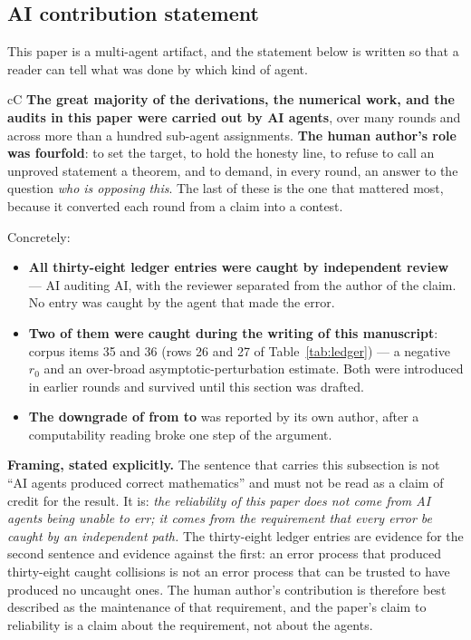 \subsection{AI contribution statement}
\label{sec:verdict-ai}

This paper is a multi-agent artifact, and the statement below is written so that a reader can tell
what was done by which kind of agent.

\begin{claimbox}{cC}
\textbf{The great majority of the derivations, the numerical work, and the audits in this paper were
carried out by AI agents}, over many rounds and across more than a hundred sub-agent assignments.
\textbf{The human author's role was fourfold}: to set the target, to hold the honesty line, to
refuse to call an unproved statement a theorem, and to demand, in every round, an answer to the
question \emph{who is opposing this}. The last of these is the one that mattered most, because it
converted each round from a claim into a contest.
\end{claimbox}

Concretely:

\begin{itemize}
\item \textbf{All thirty-eight ledger entries were caught by independent review} --- AI auditing
AI, with the reviewer separated from the author of the claim. No entry was caught by the agent that
made the error.
\item \textbf{Two of them were caught during the writing of this manuscript}: corpus items 35 and 36
(rows 26 and 27 of Table~\ref{tab:ledger}) --- a negative $r_0$ and an over-broad
asymptotic-perturbation estimate. Both were introduced in earlier
rounds and survived until this section was drafted.
\item \textbf{The downgrade of  from \LT{} to \LC{}} was reported by its own author,
after a computability reading broke one step of the argument.
\end{itemize}

\begin{warnbox}
\textbf{Framing, stated explicitly.} The sentence that carries this subsection is not ``AI agents
produced correct mathematics'' and must not be read as a claim of credit for the result. It is:
\emph{the reliability of this paper does not come from AI agents being unable to err; it comes from
the requirement that every error be caught by an independent path.} The thirty-eight ledger entries
are evidence for the second sentence and evidence against the first: an error process that
produced thirty-eight caught collisions is not an error process that can be trusted to have
produced no uncaught ones. The human author's contribution is therefore best described as the
maintenance of that requirement, and the paper's claim to reliability is a claim about the
requirement, not about the agents.
\end{warnbox}

